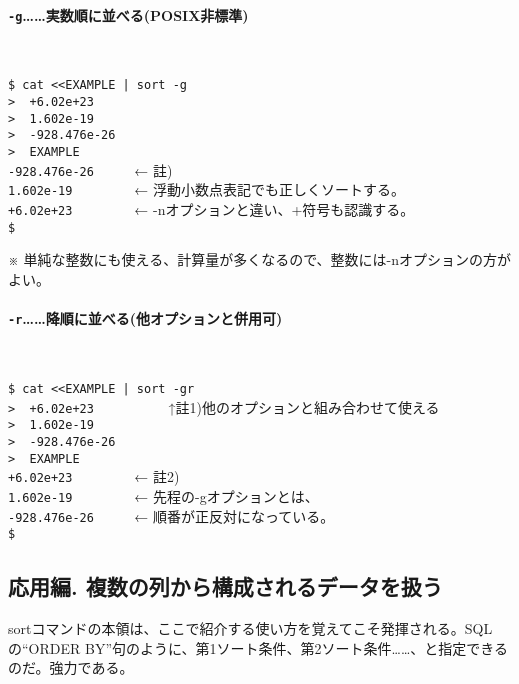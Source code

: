 \paragraph*{\verb|-g|……実数順に並べる(POSIX非標準)}　\\
\begin{screen}
	\verb!$ cat <<EXAMPLE | sort -g! \return \\
	\verb!>  +6.02e+23! \return \\
	\verb!>  1.602e-19! \return \\
	\verb!>  -928.476e-26! \return \\
	\verb!>  EXAMPLE! \return \\
	\verb!-928.476e-26     !  ← 註) \\
	\verb!1.602e-19        !  ← 浮動小数点表記でも正しくソートする。 \\
	\verb!+6.02e+23        !  ← -nオプションと違い、+符号も認識する。 \\
	\verb!$ !
\end{screen}

\noindent
※ 単純な整数にも使える、計算量が多くなるので、整数には-nオプションの方がよい。

\paragraph*{\verb|-r|……降順に並べる(他オプションと併用可)}　\\
\begin{screen}
	\verb!$ cat <<EXAMPLE | sort -gr! \return \\
	\verb!>  +6.02e+23! \return 　　　　　↑註1)他のオプションと組み合わせて使える \\
	\verb!>  1.602e-19! \return \\
	\verb!>  -928.476e-26! \return \\
	\verb!>  EXAMPLE! \return \\
	\verb!+6.02e+23        !  ← 註2) \\
	\verb!1.602e-19        !  ← 先程の-gオプションとは、 \\
	\verb!-928.476e-26     !  ← 順番が正反対になっている。 \\
	\verb!$ !
\end{screen}

\subsection*{応用編. 複数の列から構成されるデータを扱う}

sortコマンドの本領は、ここで紹介する使い方を覚えてこそ発揮される。SQLの``ORDER BY''句のように、第1ソート条件、第2ソート条件……、と指定できるのだ。強力である。

